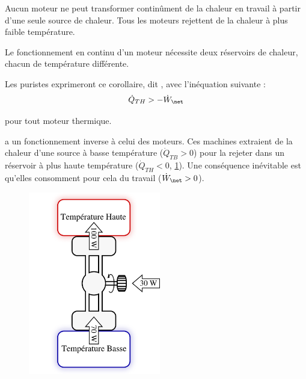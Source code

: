 \begin{description}
{			\begin{trucimportant}
			Aucun moteur ne peut transformer continûment\linebreak
			de la chaleur en travail\linebreak
			à partir d’une seule source de chaleur.\linebreak
			Tous les moteurs rejettent de la chaleur à plus faible température.\linebreak
			\end{trucimportant}
			\begin{trucimportant}
			Le fonctionnement en continu d’un moteur\linebreak
			nécessite deux réservoirs de chaleur, chacun de température différente.
			\end{trucimportant}

			Les puristes exprimeront ce corollaire, dit , avec l’inéquation suivante :
			\begin{equation}
				\dot Q_{TH} > -\dot W_\net
			\end{equation}
			\begin{equationterms}
				\item pour tout moteur thermique.
			\end{equationterms}

		}%

		\clearfloats
		\item[Un réfrigérateur, un climatiseur ou une pompe à chaleur]{a un fonctionnement inverse à celui des moteurs. Ces machines extraient de la chaleur d’une source à basse température ($\dot Q_{TB} > 0$) pour la rejeter dans un réservoir à plus haute température ($\dot Q_{TH} < 0$, \cref{fig_refrigerateur_exemplevaleurs}). Une conséquence inévitable est qu’elles consomment pour cela du travail ($\dot W_\net > 0$).

			\begin{figure}
				\begin{center}
					\includegraphics[height=8cm]{images/exemple_refrigerateur.png}
				\end{center}
				\label{fig_refrigerateur_exemplevaleurs}
			\end{figure}

}
\end{description}
